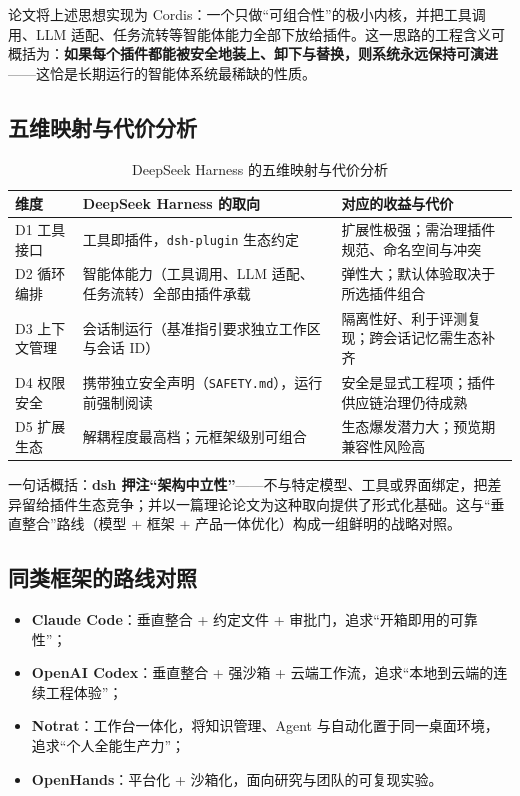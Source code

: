 \documentclass[11pt,a4paper]{ctexart}
\begin{document}
论文将上述思想实现为 Cordis：一个只做“可组合性”的极小内核，并把工具调用、LLM 适配、任务流转等智能体能力全部下放给插件。这一思路的工程含义可概括为：\textbf{如果每个插件都能被安全地装上、卸下与替换，则系统永远保持可演进}——这恰是长期运行的智能体系统最稀缺的性质。

\subsection{五维映射与代价分析}

\begin{table}[htbp]
  \centering
  \small
  \caption{DeepSeek Harness 的五维映射与代价分析}
  \label{tab:dsh-map}
  \begin{tabularx}{\textwidth}{l p{4.8cm} X}
    \toprule
    维度 & DeepSeek Harness 的取向 & 对应的收益与代价 \\
    \midrule
    D1 工具接口 & 工具即插件，\texttt{dsh-plugin} 生态约定 & 扩展性极强；需治理插件规范、命名空间与冲突 \\
    D2 循环编排 & 智能体能力（工具调用、LLM 适配、任务流转）全部由插件承载 & 弹性大；默认体验取决于所选插件组合 \\
    D3 上下文管理 & 会话制运行（基准指引要求独立工作区与会话 ID） & 隔离性好、利于评测复现；跨会话记忆需生态补齐 \\
    D4 权限安全 & 携带独立安全声明（\texttt{SAFETY.md}），运行前强制阅读 & 安全是显式工程项；插件供应链治理仍待成熟 \\
    D5 扩展生态 & 解耦程度最高档；元框架级别可组合 & 生态爆发潜力大；预览期兼容性风险高 \\
    \bottomrule
  \end{tabularx}
\end{table}

一句话概括：\textbf{dsh 押注“架构中立性”}——不与特定模型、工具或界面绑定，把差异留给插件生态竞争；并以一篇理论论文为这种取向提供了形式化基础。这与“垂直整合”路线（模型 + 框架 + 产品一体优化）构成一组鲜明的战略对照。

\subsection{同类框架的路线对照}

\begin{itemize}
  \item \textbf{Claude Code}：垂直整合 + 约定文件 + 审批门，追求“开箱即用的可靠性”；
  \item \textbf{OpenAI Codex}：垂直整合 + 强沙箱 + 云端工作流，追求“本地到云端的连续工程体验”；
  \item \textbf{Notrat}：工作台一体化，将知识管理、Agent 与自动化置于同一桌面环境，追求“个人全能生产力”；
  \item \textbf{OpenHands}：平台化 + 沙箱化，面向研究与团队的可复现实验。
\end{itemize}
\end{document}
